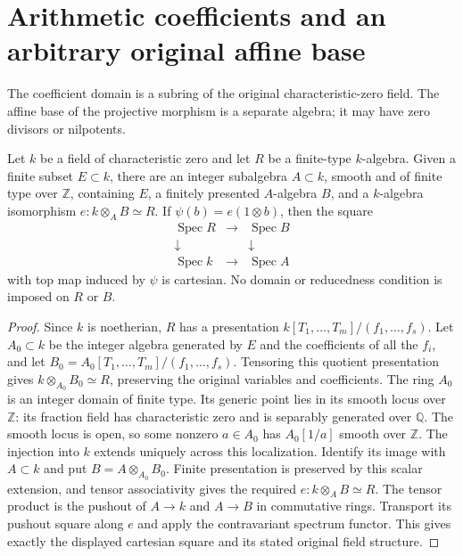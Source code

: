 \section{Arithmetic coefficients and an arbitrary original affine base}

The coefficient domain is a subring of the original characteristic-zero
field.  The affine base of the projective morphism is a separate algebra;
it may have zero divisors or nilpotents.

\begin{lemma}
\label{lem:kn-relative-arithmetic-affine-base-model}
\leanok
Let $k$ be a field of characteristic zero and let $R$ be a finite-type
$k$-algebra.  Given a finite subset $E\subset k$, there are an integer
subalgebra $A\subset k$, smooth and of finite type over $\mathbb Z$,
containing $E$, a finitely presented $A$-algebra $B$, and a $k$-algebra
isomorphism $e:k\otimes_A B\simeq R$.  If
$\psi(b)=e(1\otimes b)$, then the square
\[
\begin{matrix}
\operatorname{Spec}R&\longrightarrow&\operatorname{Spec}B\\
\downarrow&&\downarrow\\
\operatorname{Spec}k&\longrightarrow&\operatorname{Spec}A
\end{matrix}
\]
with top map induced by $\psi$ is cartesian.  No domain or reducedness
condition is imposed on $R$ or $B$.
\end{lemma}
\begin{proof}
Since $k$ is noetherian, $R$ has a presentation
$k[T_1,\ldots,T_m]/(f_1,\ldots,f_s)$.  Let $A_0\subset k$ be the
integer algebra generated by $E$ and the coefficients of all the $f_i$,
and let $B_0=A_0[T_1,\ldots,T_m]/(f_1,\ldots,f_s)$.  Tensoring this
quotient presentation gives $k\otimes_{A_0}B_0\simeq R$, preserving the
original variables and coefficients.  The ring $A_0$ is an integer
domain of finite type.  Its generic point lies in its smooth locus
over $\mathbb Z$: its fraction field has characteristic zero and is
separably generated over $\mathbb Q$.  The smooth locus is open, so
some nonzero $a\in A_0$ has $A_0[1/a]$ smooth over $\mathbb Z$.
The injection into $k$ extends uniquely across this localization.
Identify its image with $A\subset k$ and put $B=A\otimes_{A_0}B_0$.
Finite presentation is preserved by this scalar extension, and tensor
associativity gives the required $e:k\otimes_A B\simeq R$.
The tensor product is the pushout of $A\to k$ and $A\to B$ in
commutative rings.  Transport its pushout square along $e$ and apply
the contravariant spectrum functor.  This gives exactly the displayed
cartesian square and its stated original field structure.
\end{proof}
